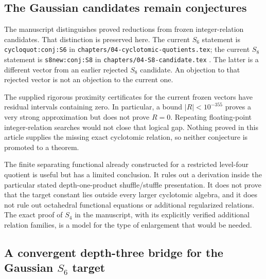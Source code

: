 \documentclass[11pt,a4paper]{article}
\theoremstyle{definition}
\theoremstyle{remark}
\numberwithin{equation}{section}
\begin{document}
\subsection{The Gaussian candidates remain conjectures}

The manuscript distinguishes proved reductions from frozen
integer-relation candidates. That distinction is preserved here.
The current $S_6$ statement is
\texttt{cycloquot:conj:S6} in
\texttt{chapters/04-cyclotomic-quotients.tex}; the current $S_8$
statement is \texttt{s8new:conj:S8} in
\texttt{chapters/04-S8-candidate.tex} \cite{Repo}.
The latter is a different vector from an earlier rejected $S_8$
candidate. An objection to that rejected vector is not an objection
to the current one.

The supplied rigorous proximity certificates for the current frozen
vectors have residual intervals containing zero. In particular, a
bound $|R|<10^{-355}$ proves a very strong approximation but does not
prove $R=0$. Repeating floating-point integer-relation searches would
not close that logical gap. Nothing proved in this article supplies
the missing exact cyclotomic relation, so neither conjecture is
promoted to a theorem.

The finite separating functional already constructed for a restricted
level-four quotient is useful but has a limited conclusion. It rules
out a derivation inside the particular stated depth-one-product
shuffle/stuffle presentation. It does not prove that the target
constant lies outside every larger cyclotomic algebra, and it does
not rule out octahedral functional equations or additional
regularized relations. The exact proof of $S_4$ in the manuscript,
with its explicitly verified additional relation families, is a
model for the type of enlargement that would be needed.

\subsection{A convergent depth-three bridge for the Gaussian $S_6$ target}
\label{audit:s6-bridge}
\end{document}

